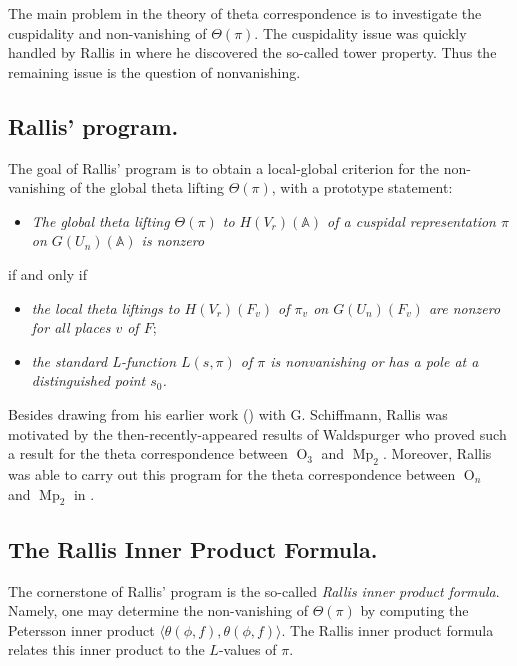 \documentclass[10pt]{amsart}
\theoremstyle{plain}
\numberwithin{equation}{section}
\begin{document}
The main problem in the theory of theta correspondence  is to
investigate the cuspidality and non-vanishing of $\Theta(\pi)$. The
cuspidality issue was quickly handled by Rallis in \cite{R2} where he
discovered the so-called tower property. Thus the remaining issue is
the question of nonvanishing. 
\vskip 5pt

\subsection{\bf Rallis' program.} 
 The goal of Rallis' program is to obtain a local-global criterion for
 the non-vanishing of the global theta lifting $\Theta(\pi)$, with a
 prototype statement: 
\begin{itemize}
\item {\it The global theta lifting $\Theta(\pi)$ to $H(V_{r})({\mathbb{A}})$ of
    a cuspidal representation $\pi$ on $G(U_{n})({\mathbb{A}})$  is nonzero}
\end{itemize}
if and only if
 \begin{itemize}
\item {\it the local theta liftings to $H(V_{r})(F_v)$ of $\pi_v$ on
    $G(U_{n})(F_v)$  are nonzero for all places $v$ of $F$}; 
\item  {\it the standard L-function $L(s,\pi)$  of $\pi$ is
    nonvanishing or has a pole at a distinguished point $s_0$.}
\end{itemize}
 Besides drawing from his earlier work (\cite{RS1, RS2, RS3}) with
 G. Schiffmann, Rallis was motivated by the then-recently-appeared
 results of Waldspurger \cite{W} who proved such a result for the theta
 correspondence between ${\operatorname{O}}_3$ and ${\operatorname{Mp}}_2$. Moreover, Rallis was able
 to carry out this program for the theta correspondence between
 ${\operatorname{O}}_n$ and ${\operatorname{Mp}}_2$ in \cite{R2, R3}. 

\vskip 10pt

\subsection{\bf The Rallis Inner Product Formula.} 
The cornerstone of Rallis' program is the so-called {\it Rallis inner
  product formula}. Namely, one may determine the non-vanishing of
$\Theta(\pi)$ by computing the Petersson inner product
$\langle \theta(\phi, f), \theta(\phi,f) \rangle$. The Rallis inner
product formula relates this inner product to the $L$-values of $\pi$.  
\vskip 5pt
\end{document}
